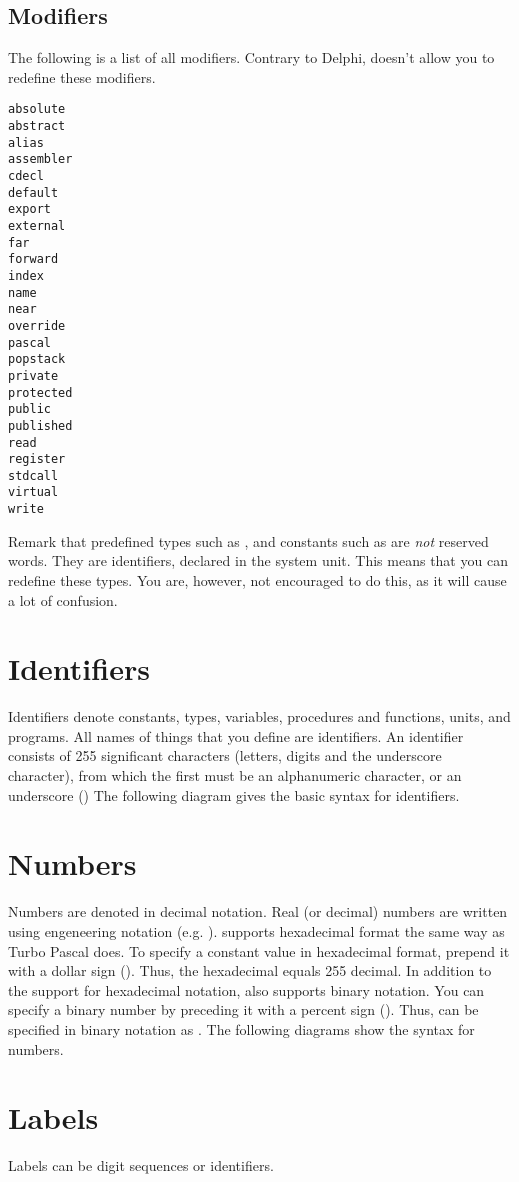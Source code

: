 \documentclass{report}
\begin{document}
\subsection{Modifiers}
The following is a list of all modifiers. Contrary to Delphi, \fpc doesn't
allow you to redefine these modifiers.
\begin{verbatim}
absolute
abstract
alias
assembler
cdecl
default
export
external
far
forward
index
name
near
override
pascal
popstack
private
protected
public
published
read
register
stdcall
virtual
write
\end{verbatim}
\latex{\end{multicols}}
Remark that predefined types such as ,  and constants
such as  are {\em not} reserved words. They are
identifiers, declared in the system unit. This means that you can redefine
these types. You are, however, not encouraged to do this, as it will cause 
a lot of confusion.
\section{Identifiers}
Identifiers denote constants, types, variables, procedures and functions,
units, and programs. All names of things that you define are identifiers.
An identifier consists of 255 significant characters (letters, digits and
the underscore character), from which the first must be an alphanumeric 
character, or an underscore (\var{\_})
The following diagram gives the basic syntax for identifiers.

\section{Numbers}
Numbers are denoted in decimal notation. Real (or decimal) numbers are
written using engeneering notation (e.g. ).
\fpc supports hexadecimal format the same way as Turbo Pascal does. To
specify a constant value in hexadecimal format, prepend it with a dollar
sign (\var{\$}). Thus, the hexadecimal  equals 255 decimal.
In addition to the support for hexadecimal notation, \fpc also supports
binary notation. You can specify a binary number by preceding it with a
percent sign (\var{\%}). Thus,  can be specified in binary notation
as .
The following diagrams show the syntax for numbers.

\section{Labels}
Labels can be digit sequences or identifiers. 

 
\end{document}
